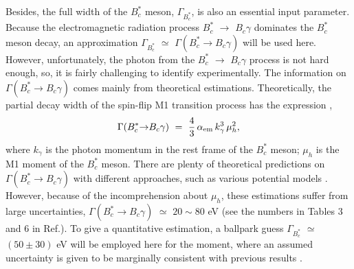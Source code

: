 \documentclass[preprint,superscriptaddress,nofootinbib]{revtex4}
\begin{document}
  Besides, the full width of the $B_{c}^{\ast}$ meson,
  ${\Gamma}_{B_{c}^{\ast}}$, is also an essential input
  parameter.
  Because the electromagnetic radiation process $B_{c}^{\ast}$
  ${\to}$ $B_{c}{\gamma}$ dominates the $B_{c}^{\ast}$ meson
  decay, an approximation ${\Gamma}_{B_{c}^{\ast}}$ ${\simeq}$
  ${\Gamma}(B_{c}^{\ast}{\to}B_{c}{\gamma})$ will be used here.
  However, unfortunately, the photon from the $B_{c}^{\ast}$
  ${\to}$ $B_{c}{\gamma}$ process is not hard enough, so,
  it is fairly challenging to identify experimentally.
  The information on ${\Gamma}(B_{c}^{\ast}{\to}B_{c}{\gamma})$
  comes mainly from theoretical estimations.
  Theoretically, the partial decay width of the spin-flip M1 transition
  process has the expression \cite{epja52.90},
   \begin{equation}
  {\Gamma}(B_{c}^{\ast}{\to}B_{c}{\gamma})\ =\
   \frac{4}{3}\,{\alpha}_{\rm em}\, k_{\gamma}^{3}\, {\mu}^{2}_{h}
   \label{m1-width},
   \end{equation}
  where $k_{\gamma}$ is the photon momentum in the rest frame of the
  $B_{c}^{\ast}$ meson;
  ${\mu}_{h}$ is the M1 moment of the $B_{c}^{\ast}$ meson.
  There are plenty of theoretical predictions on
  ${\Gamma}(B_{c}^{\ast}{\to}B_{c}{\gamma})$
  with different approaches, such as
  various potential models \cite{prd49.299,prd49.5845,prd51.3613,
  prd60.074006,prd67.014027,prd70.054017,npa699.649,npa714.183,mpla16.1785}.
  However, because of the incomprehension about ${\mu}_{h}$,
  these estimations suffer from large uncertainties,
  ${\Gamma}(B_{c}^{\ast}{\to}B_{c}{\gamma})$ ${\simeq}$
  $20{\sim}80$ eV \cite{prd49.299,prd49.5845,prd51.3613,prd60.074006,
  prd67.014027,prd70.054017,npa699.649,npa714.183,mpla16.1785}
  (see the numbers in Tables 3 and 6 in Ref.\cite{epja52.90}).
  To give a quantitative estimation, a ballpark guess
  ${\Gamma}_{B_{c}^{\ast}}$ ${\simeq}$ $(50{\pm}30)$ eV will be employed
  here for the moment, where an assumed uncertainty is given to be
  marginally consistent with previous results \cite{prd49.299,
  prd49.5845,prd51.3613,prd60.074006,prd67.014027,prd70.054017,
  npa699.649,npa714.183,mpla16.1785}.
\end{document}
